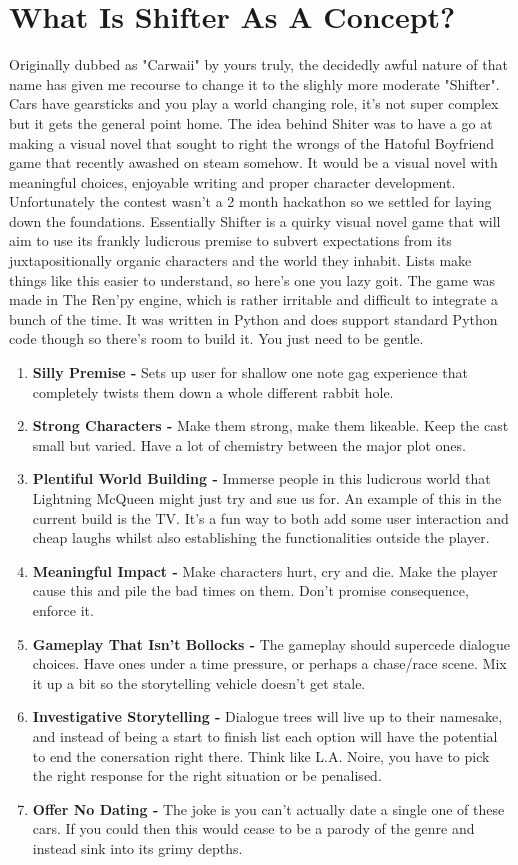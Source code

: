 \documentclass[11pt, a4paper]{article}
\begin{document}
\section{What Is Shifter As A Concept?}
Originally dubbed as "Carwaii" by yours truly, the decidedly awful nature of that name has given me recourse to change it to the slighly more moderate "Shifter". Cars have gearsticks and you play a world changing role, it's not super complex but it gets the general point home. 
The idea behind Shiter was to have a go at making a visual novel that sought to right the wrongs of the Hatoful Boyfriend game that recently awashed on steam somehow. It would be a visual novel with meaningful choices, enjoyable writing and proper character development. Unfortunately the contest wasn't a 2 month hackathon so we settled for laying down the foundations.
Essentially Shifter is a quirky visual novel game that will aim to use its frankly ludicrous premise to subvert expectations from its juxtapositionally organic characters and the world they inhabit. 
Lists make things like this easier to understand, so here's one you lazy goit. 
The game was made in The Ren'py engine, which is rather irritable and difficult to integrate a bunch of the time. It was written in Python and does support standard Python code though so there's room to build it. You just need to be gentle. 
\begin{enumerate}
\item{\textbf{Silly Premise - }Sets up user for shallow one note gag experience that completely twists them down a whole different rabbit hole.}
\item{\textbf{Strong Characters - }Make them strong, make them likeable. Keep the cast small but varied. Have a lot of chemistry between the major plot ones.}
\item{\textbf{Plentiful World Building - }Immerse people in this ludicrous world that Lightning McQueen might just try and sue us for. An example of this in the current build is the TV. It's a fun way to both add some user interaction and cheap laughs whilst also establishing the functionalities outside the player.}
\item{\textbf{Meaningful Impact - }Make characters hurt, cry and die. Make the player cause this and pile the bad times on them. Don't promise consequence, enforce it.}
\item{\textbf{Gameplay That Isn't Bollocks - }The gameplay should supercede dialogue choices. Have ones under a time pressure, or perhaps a chase/race scene. Mix it up a bit so the storytelling vehicle doesn't get stale.}
\item{\textbf{Investigative Storytelling - } Dialogue trees will live up to their namesake, and instead of being a start to finish list each option will have the potential to end the conersation right there. Think like L.A. Noire, you have to pick the right response for the right situation or be penalised.}
\item{\textbf{Offer No Dating - }The joke is you can't actually date a single one of these cars. If you could then this would cease to be a parody of the genre and instead sink into its grimy depths.}
\end{enumerate} 
\end{document}
